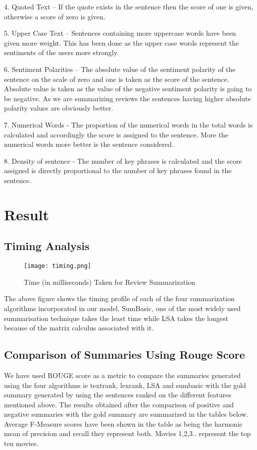 \documentclass[conference]{IEEEtran}
\begin{document}
4. Quoted Text – If the quote exists in the sentence then the score of one is given, otherwise a score of zero is given.

5. Upper Case Text – Sentences containing more uppercase words have been given more weight. This has been done as the upper case words represent the sentiments of the users more strongly.

6. Sentiment Polarities – The absolute value of the sentiment polarity of the sentence on the scale of zero and one is taken as the score of the sentence. Absolute value is taken as the value of the negative sentiment polarity is going to be negative. As we are summarizing reviews the sentences having higher absolute polarity values are obviously better.

7. Numerical Words - The proportion of the numerical words in the total words is calculated
and accordingly the score is assigned to the sentence. More the numerical words more better is the sentence considered.

8. Density of sentence - The number of key phrases is calculated and the score assigned is directly proportional to the number of key phrases found in the sentence.

\section{Result}
\subsection{Timing Analysis}

\begin{figure}[h!]
  \texttt{[image: timing.png]}
  \caption{Time (in milliseconds) Taken for Review Summarization }
  \label{fig:boat1}
\end{figure}

The above figure shows the timing profile of each of the four summarization
algorithms incorporated in our model. SumBasic, one of the most widely used
summarisation technique takes the least time while LSA takes the longest
because of the matrix calculus associated with it.

\subsection{Comparison of Summaries Using Rouge Score}

We have used ROUGE score as a metric to compare the summaries generated using the four algorithms ie textrank, lexrank, LSA and sumbasic with the gold summary generated by using the sentences ranked on the different features mentioned above. The results obtained after the comparison of positive and negative summaries with the gold summary are summarized in the tables below. Average F-Measure scores have been shown in the table as being the harmonic mean of precision and recall they represent both. Movies 1,2,3.. represent the top ten movies.
\end{document}
